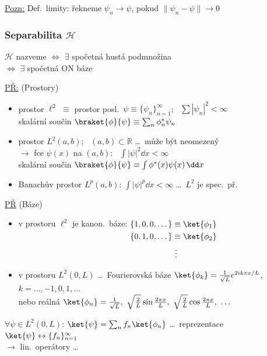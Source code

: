 \documentclass[11pt,a4paper]{article}
\begin{document}
\underline{Pozn:} Def.\ limity: řekneme $\psi_n\to\psi$, pokud $\|\psi_n - \psi\|\to 0$

\subsubsection*{Separabilita $\mathcal{H}$}
\begin{definice}[Separabilita]
$\mathcal{H}$ nazveme  $\Leftrightarrow$ $\exists$ spočetná hustá podmnožina \\
\hspace*{3.9cm} $\Leftrightarrow$ $\exists$ spočetná ON báze
\end{definice}

\underline{PŘ:} (Prostory)
\begin{itemize}[nosep]
  \item prostor $\ell^2$ $\equiv$ prostor posl.\ $\psi\equiv\{\psi_n\}_{n=1}^\infty$; \ $\sum|\psi_n|^2 < \infty$ \\
        \quad skalární součin \quad $\braket{\phi}{\psi} \equiv \sum_n\phi_n^*\psi_n$
  \item prostor $L^2(a,b)$; \ $(a,b)\subset\mathbb{R}$ \dots\ může být neomezený \\
        \quad $\to$ fce $\psi(x)$ na $(a,b)$: \ $\int|\psi|^2\dd x < \infty$ \\
        \quad skalární součin \quad $\braket{\phi}{\psi} \equiv \int\phi^*(x)\psi(x)\,\dd x$
  \item Banachův prostor $L^p(a,b)$: \quad $\int|\psi|^p\dd x < \infty$ \quad \dots\ $L^2$ je spec.\ př.
\end{itemize}

\underline{PŘ} (Báze)
\begin{itemize}[nosep]
  \item v prostoru $\ell^2$ je kanon.\ báze: \quad
        $\begin{aligned}[t] \{1,0,0,\dots\} &\equiv \ket{\phi_1} \\ \{0,1,0,\dots\} &\equiv \ket{\phi_2} \\ &\ \vdots \end{aligned}$
  \item v prostoru $L^2(0,L)$ \dots\ Fourierovská báze \quad
        $\ket{\phi_k} = \frac{1}{\sqrt L}e^{2ik\pi x/L}$, \quad $k = \dots,-1,0,1,\dots$ \\
        \quad nebo reálná \quad $\ket{\phi_n} = \frac{1}{\sqrt L},\ \sqrt{\frac2L}\sin\frac{2\pi x}{L},\ \sqrt{\frac2L}\cos\frac{2\pi x}{L},\ \dots$
\end{itemize}
$\forall\psi\in L^2(0,L)$: \quad $\ket{\psi} = \sum_n f_n\ket{\phi_n}$ \quad \dots\ reprezentace $\ket{\psi}\leftrightarrow\{f_n\}_{n=1}^\infty$ \\
$\to$  \hfill lin.\ operátory \dots\ 
\end{document}
